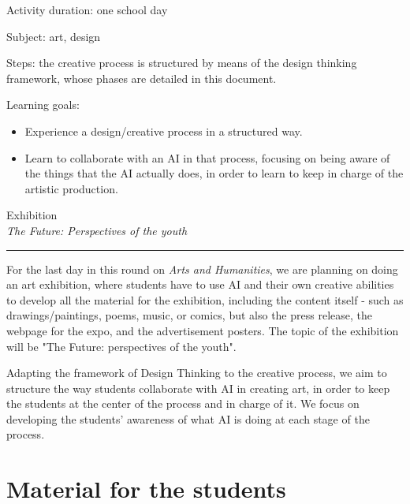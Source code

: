 \documentclass[12pt]{article}
\begin{document}
\vspace*{0.5\textheight}

Activity duration: one school day

Subject: art, design
\vspace{0.5cm}

Steps: the creative process is structured by means of the design thinking framework, whose phases are detailed in this document.

\vspace{0.5cm}
Learning goals:

\begin{itemize}
    \item Experience a design/creative process in a structured way.
    \item Learn to collaborate with an AI in that process, focusing on being aware of the things that the AI actually does, in order to learn to keep in charge of the artistic production.
\end{itemize}

\newpage

\begin{center}
    {\Huge \color{maincolor} Exhibition}\\[5pt]
    {\large \textit{The Future: Perspectives of the youth}}\\
    \rule{\linewidth}{1pt}
\end{center}

\vspace{0.5cm}

For the last day in this round on \textit{Arts and Humanities}, we are planning on doing an art exhibition, where students have to use AI and their own creative abilities to develop all the material for the exhibition, including the content itself - such as drawings/paintings, poems, music, or comics, but also the press release, the webpage for the expo, and the advertisement posters. The topic of the exhibition will be "The Future: perspectives of the youth". 

Adapting the framework of Design Thinking to the creative process, we aim to structure the way students collaborate with AI in creating art, in order to keep the students at the center of the process and in charge of it. We focus on developing the students' awareness of what AI is doing at each stage of the process.

\section{Material for the students}
\end{document}
